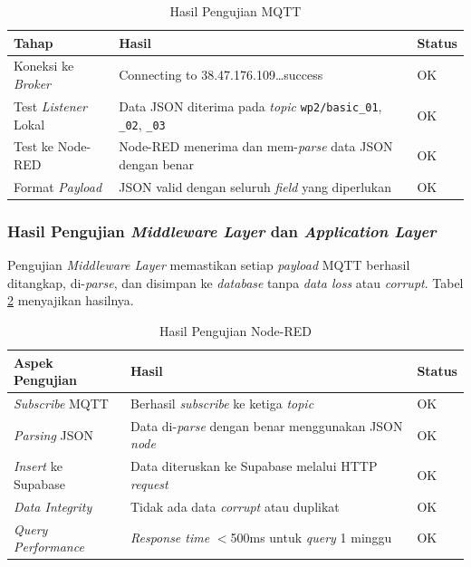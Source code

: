 \begin{table}[H]
  \caption{Hasil Pengujian MQTT}
  \label{tab:hasil-mqtt}
  \begin{tabularx}{\textwidth}{| l | X | l |}
    \hline
    \textbf{Tahap} & \textbf{Hasil} & \textbf{Status} \\
    \hline
    Koneksi ke \textit{Broker}   & Connecting to 38.47.176.109\ldots success & OK \\
    \hline
    Test \textit{Listener} Lokal & Data JSON diterima pada \textit{topic} \texttt{wp2/basic\_01}, \texttt{\_02}, \texttt{\_03} & OK \\
    \hline
    Test ke Node-RED             & Node-RED menerima dan mem-\textit{parse} data JSON dengan benar & OK \\
    \hline
    Format \textit{Payload}      & JSON valid dengan seluruh \textit{field} yang diperlukan & OK \\
    \hline
  \end{tabularx}
\end{table}

\subsubsection{Hasil Pengujian \textit{Middleware Layer} dan \textit{Application Layer}}

Pengujian \textit{Middleware Layer} memastikan setiap \textit{payload} MQTT berhasil ditangkap, di-\textit{parse}, dan disimpan ke \textit{database} tanpa \textit{data loss} atau \textit{corrupt}. Tabel \ref{tab:hasil-nodered} menyajikan hasilnya.

\begin{table}[H]
  \caption{Hasil Pengujian Node-RED}
  \label{tab:hasil-nodered}
  \begin{tabularx}{\textwidth}{| X | X | l |}
    \hline
    \textbf{Aspek Pengujian} & \textbf{Hasil} & \textbf{Status} \\
    \hline
    \textit{Subscribe} MQTT    & Berhasil \textit{subscribe} ke ketiga \textit{topic} & OK \\
    \hline
    \textit{Parsing} JSON      & Data di-\textit{parse} dengan benar menggunakan JSON \textit{node} & OK \\
    \hline
    \textit{Insert} ke Supabase & Data diteruskan ke Supabase melalui HTTP \textit{request} & OK \\
    \hline
    \textit{Data Integrity}    & Tidak ada data \textit{corrupt} atau duplikat & OK \\
    \hline
    \textit{Query Performance} & \textit{Response time} $<$500ms untuk \textit{query} 1 minggu & OK \\
    \hline
  \end{tabularx}
\end{table}

